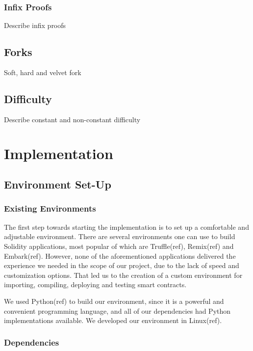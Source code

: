 \documentclass{article}
\begin{document}
  \subsubsection{Infix Proofs}

  Describe infix proofs

  \subsection{Forks}

  Soft, hard and velvet fork

  \subsection{Difficulty}

  Describe constant and non-constant difficulty

  \pagebreak

  \section{Implementation}

  \subsection{Environment Set-Up}

  \subsubsection{Existing Environments}

  The first step towards starting the implementation is to set up a
  comfortable and adjustable environment. There are several environments
  one can use to build Solidity applications, most popular of which are
  Truffle(ref), Remix(ref) and Embark(ref). However, none of the
  aforementioned applications delivered the experience we needed in the
  scope of our project, due to the lack of speed and customization
  options. That led us to the creation of a custom environment for
  importing, compiling, deploying and testing smart contracts.

  We used Python(ref) to build our environment, since it is a powerful
  and convenient programming language, and all of our dependencies had
  Python implementations available. We developed our environment in
  Linux(ref).

  \subsubsection{Dependencies}
\end{document}
